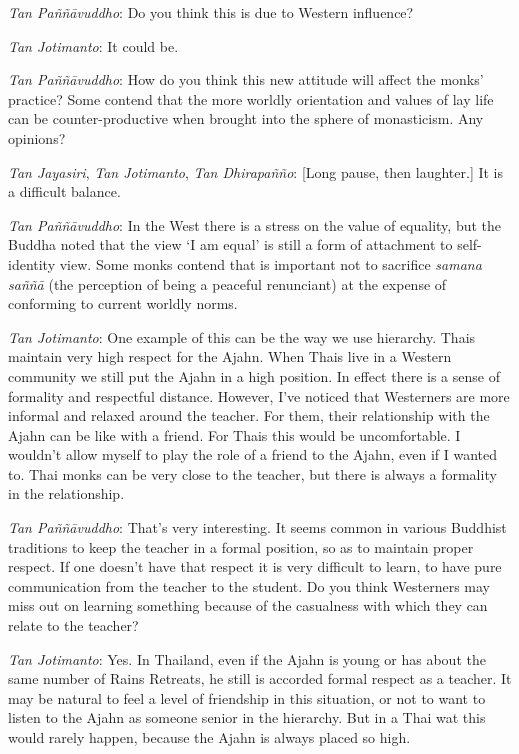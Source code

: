 \emph{Tan Paññāvuddho}‎: Do you think this is due to Western influence?

\emph{Tan Jotimanto}: It could be.

\emph{Tan Paññāvuddho}‎: How do you think this new attitude will affect
the monks' practice? Some contend that the more worldly orientation and
values of lay life can be counter-productive when brought into the
sphere of monasticism. Any opinions?

\emph{Tan Jayasiri}, \emph{Tan Jotimanto}, \emph{Tan Dhirapañño}‎:
{[}Long pause, then laughter.{]} It is a difficult balance.

\emph{Tan Paññāvuddho}‎: In the West there is a stress on the value of
equality, but the Buddha noted that the view `I am equal' is still a
form of attachment to self-identity view. Some monks contend that is
important not to sacrifice \emph{samana saññā} (the perception of being
a peaceful renunciant) at the expense of conforming to current worldly
norms.

\emph{Tan Jotimanto}: One example of this can be the way we use
hierarchy. Thais maintain very high respect for the Ajahn. When Thais
live in a Western community we still put the Ajahn in a high position.
In effect there is a sense of formality and respectful distance.
However, I've noticed that Westerners are more informal and relaxed
around the teacher. For them, their relationship with the Ajahn can be
like with a friend. For Thais this would be uncomfortable. I wouldn't
allow myself to play the role of a friend to the Ajahn, even if I wanted
to. Thai monks can be very close to the teacher, but there is always a
formality in the relationship.

\emph{Tan Paññāvuddho}‎: That's very interesting. It seems common in
various Buddhist traditions to keep the teacher in a formal position, so
as to maintain proper respect. If one doesn't have that respect it is
very difficult to learn, to have pure communication from the teacher to
the student. Do you think Westerners may miss out on learning something
because of the casualness with which they can relate to the teacher?

\emph{Tan Jotimanto}: Yes. In Thailand, even if the Ajahn is young or
has about the same number of Rains Retreats, he still is accorded formal
respect as a teacher. It may be natural to feel a level of friendship in
this situation, or not to want to listen to the Ajahn as someone senior
in the hierarchy. But in a Thai wat this would rarely happen, because
the Ajahn is always placed so high.

